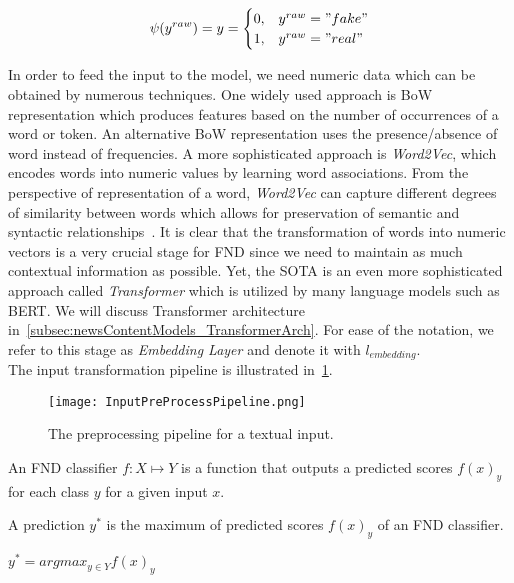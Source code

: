 \begin{center}
    \[\psi(y^{raw}) = y =
        \begin{cases}
            0, & y^{raw} = "fake" \\
            1, & y^{raw} = "real"
        \end{cases}
    \]
\end{center}
In order to feed the input to the model, we need numeric data which can be obtained by numerous techniques. One widely used approach is BoW representation which produces features based on the number of occurrences of a word or token. An alternative BoW representation uses the presence/absence of word instead of frequencies. A more sophisticated approach is \emph{Word2Vec}, which encodes words into numeric values by learning word associations. From the perspective of representation of a word, \emph{Word2Vec} can capture different degrees of similarity between words which allows for preservation of semantic and syntactic relationships~\parencite{Word2Vec_Mikolov}. It is clear that the transformation of words into numeric vectors is a very crucial stage for FND since we need to maintain as much contextual information as possible. Yet, the SOTA is an even more sophisticated approach called \emph{Transformer} which is utilized by many language models such as BERT. We will discuss Transformer architecture in~\ref{subsec:newsContentModels_TransformerArch}. For ease of the notation, we refer to this stage as \emph{Embedding Layer} and denote it with $l_{embedding}$.\\
The input transformation pipeline is illustrated in~\ref{fig:InputPreProcessPipeline}.
\begin{figure}
    \texttt{[image: InputPreProcessPipeline.png]}
    \caption[The preprocessing pipeline for a textual input.]{The preprocessing pipeline for a textual input.}
    \label{fig:InputPreProcessPipeline}
\end{figure}
\begin{definition}
    An FND classifier $f:X \mapsto Y$ is a function that outputs a predicted scores $f(x)_y$ for each class $y$ for a given input $x$.
\end{definition}
\begin{definition}
    A prediction $y^*$ is the maximum of predicted scores $f(x)_y$ of an FND classifier.
    \begin{center}
        $y^* = argmax_{y \in Y} f(x)_y$
    \end{center}
\end{definition}
